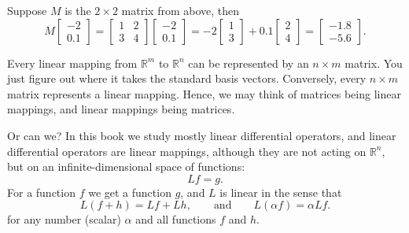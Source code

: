 Suppose $M$ is the $2 \times 2$ matrix from above,
then
\begin{equation*}
M
\begin{bmatrix}
-2 \\ 0.1
\end{bmatrix}
=
\begin{bmatrix}
1 & 2 \\
3 & 4
\end{bmatrix}
\begin{bmatrix}
-2 \\ 0.1
\end{bmatrix}
=
-2
\begin{bmatrix}
1 \\ 3
\end{bmatrix}
+
0.1
\begin{bmatrix}
2 \\ 4
\end{bmatrix}
=
\begin{bmatrix}
-1.8 \\ -5.6
\end{bmatrix} .
\end{equation*}

Every linear mapping from ${\mathbb R}^m$ to ${\mathbb R}^n$ can be
represented by an $n \times m$ matrix.  You just figure out where it
takes the standard basis vectors.  Conversely, every $n \times m$ matrix
represents a linear mapping.  Hence, we may think of matrices being
linear mappings, and linear mappings being matrices.

Or can we?  In this book we study mostly linear differential operators,
and linear differential operators are linear mappings, although they are
not acting on ${\mathbb R}^n$, but on 
an infinite-dimensional space of functions:
\begin{equation*}
L f = g .
\end{equation*}
For a function $f$ we get a function $g$, and $L$ is linear in the sense that
\begin{equation*}
L ( f + h) = Lf + Lh, \qquad \text{and} \qquad
L (\alpha f) = \alpha Lf .
\end{equation*}
for any number (scalar) $\alpha$ and all functions $f$ and $h$.

